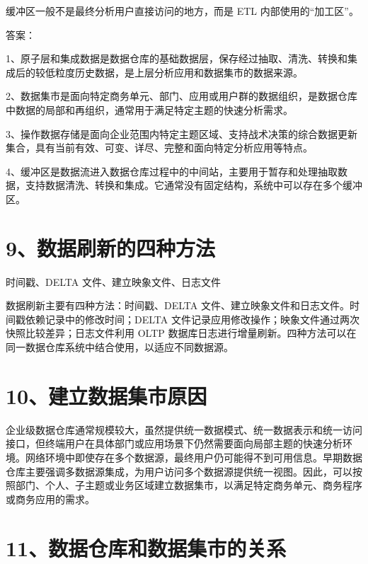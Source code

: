 \documentclass[UTF8,zihao=-4]{ctexart}
\begin{document}
缓冲区一般不是最终分析用户直接访问的地方，而是 ETL 内部使用的“加工区”。\par

答案：\par
1、原子层和集成数据是数据仓库的基础数据层，保存经过抽取、清洗、转换和集成后的较低粒度历史数据，是上层分析应用和数据集市的数据来源。\par
2、数据集市是面向特定商务单元、部门、应用或用户群的数据组织，是数据仓库中数据的局部和再组织，通常用于满足特定主题的快速分析需求。\par
3、操作数据存储是面向企业范围内特定主题区域、支持战术决策的综合数据更新集合，具有当前有效、可变、详尽、完整和面向特定分析应用等特点。\par
4、缓冲区是数据流进入数据仓库过程中的中间站，主要用于暂存和处理抽取数据，支持数据清洗、转换和集成。它通常没有固定结构，系统中可以存在多个缓冲区。\par

\newpage
\section*{9、数据刷新的四种方法}

时间戳、DELTA 文件、建立映象文件、日志文件\par

数据刷新主要有四种方法：时间戳、DELTA 文件、建立映象文件和日志文件。时间戳依赖记录中的修改时间；DELTA 文件记录应用修改操作；映象文件通过两次快照比较差异；日志文件利用 OLTP 数据库日志进行增量刷新。四种方法可以在同一数据仓库系统中结合使用，以适应不同数据源。\par

\newpage
\section*{10、建立数据集市原因}

企业级数据仓库通常规模较大，虽然提供统一数据模式、统一数据表示和统一访问接口，但终端用户在具体部门或应用场景下仍然需要面向局部主题的快速分析环境。网络环境中即使存在多个数据源，最终用户仍可能得不到可用信息。早期数据仓库主要强调多数据源集成，为用户访问多个数据源提供统一视图。因此，可以按照部门、个人、子主题或业务区域建立数据集市，以满足特定商务单元、商务程序或商务应用的需求。\par

\newpage
\section*{11、数据仓库和数据集市的关系}
\end{document}
